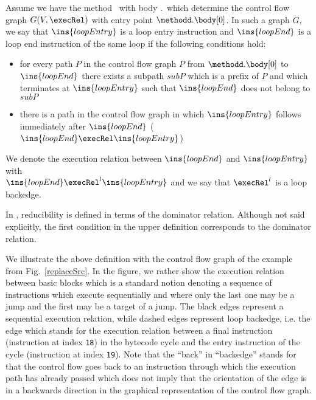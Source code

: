 \begin{defLoop}
\label{defLoop}
Assume we have the method \methodd \ with body \methodd.\body \ which determine the control flow graph $G(V, \execRel) $
with entry point $\methodd.\body[0]$.
 In such a graph $G$, we say that $\ins{loopEntry}$ is a loop entry instruction and $\ins{loopEnd}$ is a loop end instruction
 of the same loop if the following conditions hold:
\begin{itemize}
\item for every path $P$ in the control flow graph $P$ from $\methodd.\body[0]$ to  $\ins{loopEnd}$
     there exists a subpath $subP$ which is a prefix of $P$ and which terminates at $\ins{loopEntry}$  %
          such that $\ins{loopEnd}$ does not belong to   $subP$ %
\item there is a path in the control flow graph in which $\ins{loopEntry}$  follows immediately after $\ins{loopEnd}$ ( $\ins{loopEnd} \execRel \ins{loopEntry}$)
\end{itemize}
We denote the execution relation between $\ins{loopEnd}$ and  $\ins{loopEntry}$ with \\
$\ins{loopEnd} \execRel^l \ins{loopEntry}$ and we say that $  \execRel^l $  is a loop backedge. 
\end{defLoop}
In  \cite{ARUCom1986},  reducibility is defined in terms of the dominator relation. 
Although  not said explicitly, the first condition in the upper definition corresponds to the dominator relation.%

We illustrate the above definition with the control flow graph of the example from Fig.\ \ref{replaceSrc}.%
In the figure, we rather show the execution relation between basic blocks which is a standard notion denoting a sequence of instructions which execute sequentially
and  where only the last one may be a jump and the first may be a target of a jump. 
The black edges represent a sequential execution relation, while dashed edges represent  loop backedge, i.e. the edge which stands for the execution
relation between a final instruction (instruction at index \texttt{18}) in the bytecode cycle and the entry instruction of the cycle (instruction at index \texttt{19}).  
Note that the ``back'' in ``backedge'' stands for  that the control flow goes back to an instruction through which 
the execution path has already passed which does not imply that the orientation of the edge is in a backwards direction in the graphical representation 
of the control flow graph.

